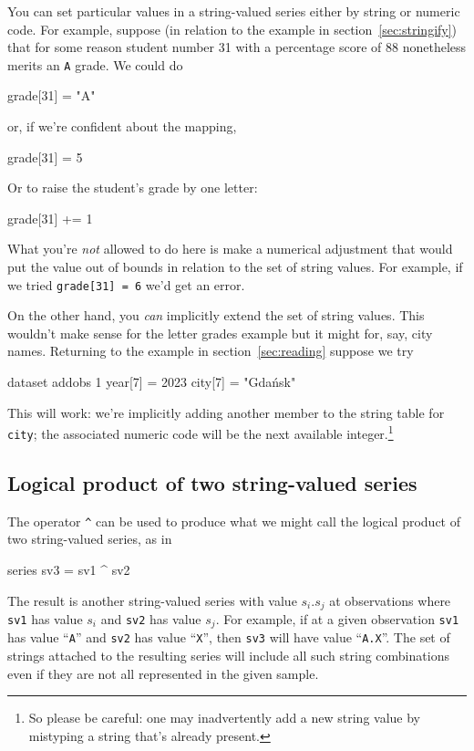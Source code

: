 You can set particular values in a string-valued series either by
string or numeric code. For example, suppose (in relation to the
example in section~\ref{sec:stringify}) that for some reason student
number 31 with a percentage score of 88 nonetheless merits an
\texttt{A} grade. We could do
\begin{code}
grade[31] = "A"
\end{code}
or, if we're confident about the mapping,
\begin{code}
grade[31] = 5
\end{code}
Or to raise the student's grade by one letter:
\begin{code}
grade[31] += 1
\end{code}

What you're \textit{not} allowed to do here is make a numerical
adjustment that would put the value out of bounds in relation to the
set of string values. For example, if we tried \texttt{grade[31] = 6}
we'd get an error.

On the other hand, you \textit{can} implicitly extend the set of
string values. This wouldn't make sense for the letter grades example
but it might for, say, city names. Returning to the example in
section~\ref{sec:reading} suppose we try
%
\begin{code}
dataset addobs 1
year[7] = 2023
city[7] = "Gdańsk"
\end{code}
%
This will work: we're implicitly adding another member to the string
table for \texttt{city}; the associated numeric code will be the next
available integer.\footnote{So please be careful: one may
  inadvertently add a new string value by mistyping a string that's
  already present.}

\subsection{Logical product of two string-valued series}

The operator \verb|^| can be used to produce what we might call the
logical product of two string-valued series, as in
\begin{code}
series sv3 = sv1 ^ sv2
\end{code}
The result is another string-valued series with value $s_i.s_j$ at
observations where \texttt{sv1} has value $s_i$ and \texttt{sv2} has
value $s_j$. For example, if at a given observation \texttt{sv1} has
value ``\texttt{A}'' and \texttt{sv2} has value ``\texttt{X}'', then
\texttt{sv3} will have value ``\texttt{A.X}''. The set of strings
attached to the resulting series will include all such string
combinations even if they are not all represented in the given sample.

